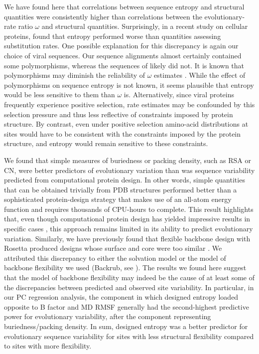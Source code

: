 \documentclass[smallextended]{svjour3}
\begin{document}
We have found here that correlations between sequence entropy and structural quantities were consistently higher than correlations between the evolutionary-rate ratio $\omega$ and structural quantities. Surprisingly, in a recent study on cellular proteins, \citet{Yehetal2014b} found that entropy performed worse than quantities assessing substitution rates. One possible explanation for this discrepancy is again our choice of viral sequences. Our sequence alignments almost certainly contained some polymorphisms, whereas the sequences of \citet{Yehetal2014b} likely did not. It is known that polymorphisms may diminish the reliability of $\omega$ estimates \citep{KryazhimskiyPlotkin2008}. While the effect of polymorphisms on sequence entropy is not known, it seems plausible that entropy would be less sensitive to them than $\omega$ is. Alternatively, since viral proteins frequently experience positive selection, rate estimates may be confounded by this selection pressure and thus less reflective of constraints imposed by protein structure. By contrast, even under positive selection amino-acid distributions at sites would have to be consistent with the constraints imposed by the protein structure, and entropy would remain sensitive to these constraints.

We found that simple measures of buriedness or packing density, such as RSA or CN, were better predictors of evolutionary variation than was sequence variability predicted from computational protein design. In other words, simple quantities that can be obtained trivially from PDB structures performed better than a sophisticated protein-design strategy that makes use of an all-atom energy function and requires thousands of CPU-hours to complete. This result highlights that, even though computational protein design has yielded impressive results in specific cases \citep{Kuhlman2003,Rothlisberger2008,Fleishman2011}, this approach remains limited in its ability to predict evolutionary variation. Similarly, we have previously found that flexible backbone design with Rosetta produced designs whose surface and core were too similar \citep{Jacksonetal2013}. We attributed this discrepancy to either the solvation model or the model of backbone flexibility we used (Backrub, see \citealt{Smith2008}). The results we found here suggest that the model of backbone flexibility may indeed be the cause of at least some of the discrepancies between predicted and observed site variability. In particular, in our PC regression analysis, the component in which designed entropy loaded opposite to B factor and MD RMSF generally had the second-highest predictive power for evolutionary variability, after the component representing buriedness/packing density. In sum, designed entropy was a better predictor for evolutionary sequence variability for sites with less structural flexibility compared to sites with more flexibility.
\end{document}
